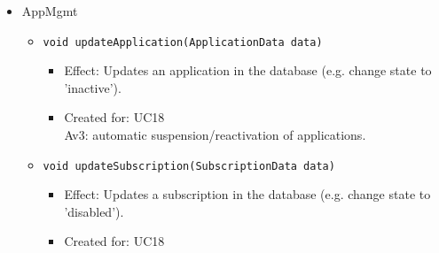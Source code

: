\begin{itemize}
            \item AppMgmt
            \begin{itemize}
                \item \texttt{void updateApplication(ApplicationData data)}
                \begin{itemize}
                    \item Effect: Updates an application in the database (e.g. change state to 'inactive').
                    \item Created for: UC18 \\
                          Av3: automatic suspension/reactivation of applications.
                \end{itemize}
                \item \texttt{void updateSubscription(SubscriptionData data)}
                \begin{itemize}
                    \item Effect: Updates a subscription in the database (e.g. change state to 'disabled').
                    \item Created for: UC18
                \end{itemize}
            \end{itemize}
        \end{itemize}

